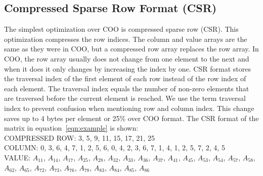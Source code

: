 \subsection{Compressed Sparse Row Format (CSR)}
\label{sec:csr}
The simplest optimization over COO is compressed sparse row (CSR). This optimization compresses the row indices. The column and value arrays are the same as they were in COO, but a compressed row array replaces the row array. In COO, the row array usually does not change from one element to the next and when it does it only changes by increasing the index by one. CSR format stores the traversal index of the first element of each row instead of the row index of each element. The traversal index equals the number of non-zero elements that are traversed before the current element is reached. We use the term traversal index to prevent confusion when mentioning row and column index. This change saves up to 4 bytes per element or 25\% over COO format. The CSR format of the matrix in equation~\ref{eqn:example} is shown: \\
COMPRESSED ROW: 3, 5, 9, 11, 15, 17, 21, 25 \\
COLUMN: 0, 3, 6, 4, 7, 1, 2, 5, 6, 0, 4, 2, 3, 6, 7, 1, 4, 1, 2, 5, 7, 2, 4, 5\\ 
VALUE: $A_{11}$, $A_{14}$, $A_{17}$, $A_{25}$, $A_{28}$, $A_{32}$, $A_{33}$, $A_{36}$, $A_{37}$, $A_{41}$, $A_{45}$, $A_{53}$, $A_{54}$, $A_{57}$, $A_{58}$, $A_{62}$, $A_{65}$, $A_{72}$, $A_{73}$, $A_{76}$, $A_{78}$, $A_{83}$, $A_{84}$, $A_{85}$, $A_{86}$ \par

